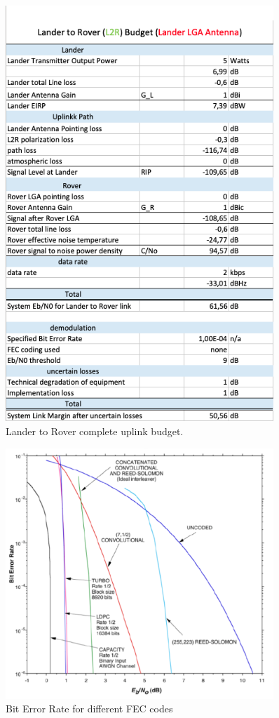 \begin{figure}[hbt]
	\centering
  		\includegraphics[width=0.9\textwidth]{Media/LB-LandertoRover.png}
  \caption{Lander to Rover complete uplink budget.}
  \label{fig:LB-L2R}
\end{figure}

\begin{figure}[htb]
	\centering
  		\includegraphics[width=0.9\textwidth]{Media/Bit_Error_Rate.png}
  \caption{Bit Error Rate for different FEC codes}
  \label{fig:BitErrorRate}
\end{figure}

